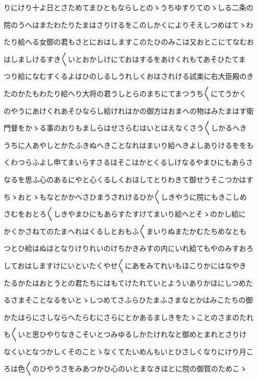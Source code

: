 \documentclass[a4paper,11pt,landscape]{ltjtarticle}
\begin{document}
りにけり十よ日とさためてまひともならしとのゝうちゆすりてのゝしる二条の
\par\medskip
院のうへはまたわたりたまはさりけるをこのしかくによりそえしつめはてゝわ
\par\medskip
たり給へる女御の君もさとにおはしますこのたひのみこは又おとこにてなむお
\par\medskip
はしましけるすき〱いとおかしけにておはするをあけくれもてあそひたてま
\par\medskip
つり給になむすくるよはひのしるしうれしくおほされける試楽に右大臣殿のき
\par\medskip
たのかたもわたり給へり大将の君うしとらのまちにてまつうち〱にてうかく
\par\medskip
のやうにあけくれあそひならし給けれはかの御方はおまへの物はみたまはす衛
\par\medskip
門督をかゝる事のおりもましらはせさらむはいとはえなくさう〱しかるへき
\par\medskip
うちに人あやしとかたふきぬへきことなれはまいり給へきよしありけるををも
\par\medskip
くわつらふよし申てまいらすさるはそこはかとくるしけなるやまひにもあらさ
\par\medskip
なるを思ふ心のあるにやと心くるしくおほしてとりわきて御せうそこつかはす
\par\medskip
ちゝおとゝもなとかかへさひまうされけるひか〱しきやうに院にもきこしめ
\par\medskip
さむをおとろ〱しきやまひにもあらすたすけてまいり給へとそゝのかし給に
\par\medskip
かくかさねてのたまへれはくるしとおもふ〱まいりぬまたかむたちめなとも
\par\medskip
つとひ給はぬほとなりけりれいのけちかきみすの内にいれ給てもやのみすおろ
\par\medskip
しておはしますけにいといたくやせ〱にあをみてれいもほこりかにはなやき
\par\medskip
たるかたはおとうとの君たちにはもてけたれていとよういありかほにしつめた
\par\medskip
るさまそことなるをいとゝしつめてさふらひたまふさまなとかはみこたちの御
\par\medskip
かたはらにさしならへたらむにさらにとかあるましきをたゝことのさまのたれ
\par\medskip
も〱いと思ひやりなきこそいとつみゆるしかたけれなと御めとまれとさりけ
\par\medskip
なくいとなつかしくそのことゝなくてたいめんもいとひさしくなりにけり月こ
\par\medskip
ろは色〱のひやうさをみあつかひ心のいとまなきほとに院の御賀のためこゝ
\end{document}
